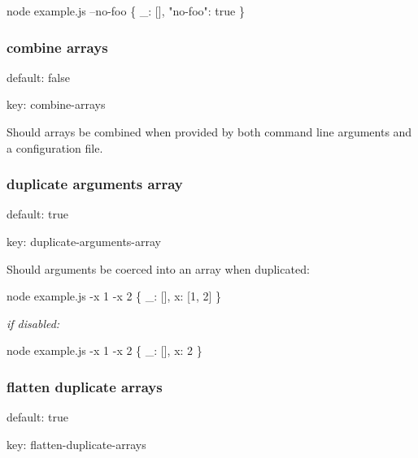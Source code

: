 \begin{DoxyCode}
node example.js --no-foo
\{ \_: [], "no-foo": true \}
\end{DoxyCode}


\subsubsection*{combine arrays}


\begin{DoxyItemize}
\item default\+: {\ttfamily false}
\item key\+: {\ttfamily combine-\/arrays}
\end{DoxyItemize}

Should arrays be combined when provided by both command line arguments and a configuration file.

\subsubsection*{duplicate arguments array}


\begin{DoxyItemize}
\item default\+: {\ttfamily true}
\item key\+: {\ttfamily duplicate-\/arguments-\/array}
\end{DoxyItemize}

Should arguments be coerced into an array when duplicated\+:


\begin{DoxyCode}
node example.js -x 1 -x 2
\{ \_: [], x: [1, 2] \}
\end{DoxyCode}


{\itshape if disabled\+:}


\begin{DoxyCode}
node example.js -x 1 -x 2
\{ \_: [], x: 2 \}
\end{DoxyCode}


\subsubsection*{flatten duplicate arrays}


\begin{DoxyItemize}
\item default\+: {\ttfamily true}
\item key\+: {\ttfamily flatten-\/duplicate-\/arrays}
\end{DoxyItemize}

